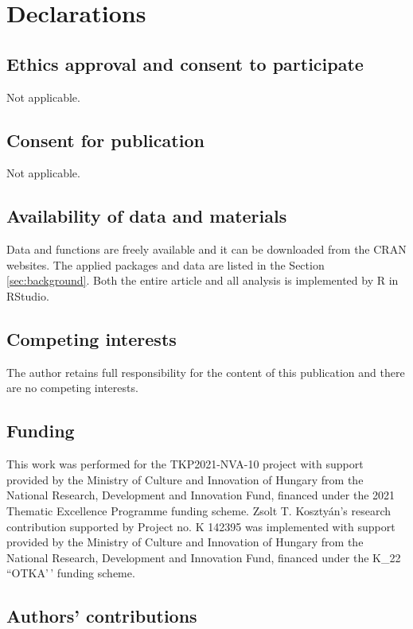 \documentclass[preprint,
3p]{elsarticle} %
\begin{document}
\section*{Declarations}

\subsection*{Ethics approval and consent to participate}

Not applicable.

\subsection*{Consent for publication}

Not applicable.

\subsection*{Availability of data and materials}

Data and functions are freely available and it can be downloaded from
the CRAN websites. The applied packages and data are listed in the
Section \ref{sec:background}. Both the entire article and all analysis
is implemented by R in RStudio.

\subsection*{Competing interests}

The author retains full responsibility for the content of this
publication and there are no competing interests.

\subsection*{Funding}
\label{s:acknowledgements}

This work was performed for the TKP2021-NVA-10 project with support
provided by the Ministry of Culture and Innovation of Hungary from the
National Research, Development and Innovation Fund, financed under the
2021 Thematic Excellence Programme funding scheme. Zsolt T. Kosztyán's
research contribution supported by Project no. K 142395 was implemented
with support provided by the Ministry of Culture and Innovation of
Hungary from the National Research, Development and Innovation Fund,
financed under the K\_22 ``OTKA'\,' funding scheme.

\subsection*{Authors' contributions}
\end{document}
